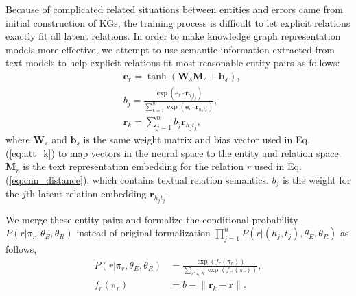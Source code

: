 \documentclass[letterpaper]{article} %
\begin{document}
Because of complicated related situations between entities and errors came from initial construction of KGs, the training process is difficult to let explicit relations exactly fit all latent relations. In order to make knowledge graph representation models more effective, we attempt to use semantic information extracted from text models to help explicit relations fit most reasonable entity pairs as follows:
\begin{align}
&\mathbf{e}_r  = \tanh(\mathbf{W}_s\mathbf{M}_r+\mathbf{b}_s), \\\nonumber
&b_j  =\frac{\exp(\mathbf{e}_{r}\cdot\mathbf{r}_{h_jt_j})}{\sum_{k = 1}^{n} \exp(\mathbf{e}_{r}\cdot\mathbf{r}_{h_kt_k})}, \\\nonumber
&\mathbf{r}_{k}  = \sum_{j = 1}^{n} b_j\mathbf{r}_{h_jt_j},
\end{align}
where $\mathbf{W}_s$ and $\mathbf{b}_s$ is the same weight matrix and bias vector used in Eq. (\ref{eq:att_k}) to map vectors in the neural space to the entity and relation space. $\mathbf{M}_r$ is the text representation embedding for the relation $r$ used in Eq. (\ref{eq:cnn_distance}), which contains textual relation semantics. $b_j$ is the weight for the $j$th latent relation embedding $\mathbf{r}_{h_jt_j}$.

We merge these entity pairs and formalize the conditional probability $P(r|\pi_r,{\theta_E, \theta_R})$ instead of original formalization $\prod_{j=1}^{n}P(r|(h_j, t_j),{\theta_E, \theta_R})$ as follows,
\begin{align}
P(r|\pi_r,{\theta_E, \theta_R}) &= \frac{\exp(f_r(\pi_r))}{\sum_{{r'} \in R} \exp(f_{r'}(\pi_r))},\\\nonumber
f_r(\pi_r) &= b - \lVert \textbf{r}_{k} - \textbf{r} \rVert.
\end{align}








\end{document}
